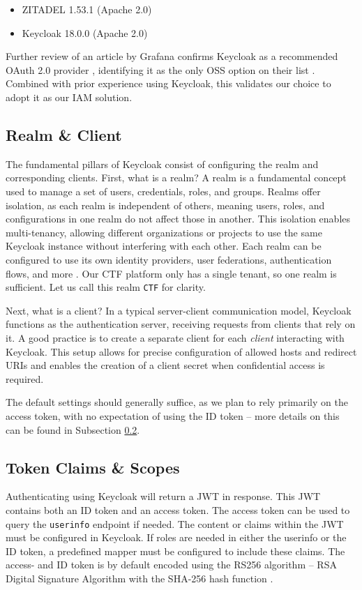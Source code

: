 \begin{itemize}
    \item ZITADEL 1.53.1 (Apache 2.0)
    \item Keycloak 18.0.0 (Apache 2.0)
\end{itemize}

Further review of an article by Grafana confirms Keycloak as a recommended OAuth 2.0 provider \parencite{keycloak}, identifying it as the only OSS option on their list \parencite{grafana_oauth}. Combined with prior experience using Keycloak, this validates our choice to adopt it as our IAM solution.

\subsection{Realm \& Client}
The fundamental pillars of Keycloak consist of configuring the realm and corresponding clients. First, what is a realm? A realm is a fundamental concept used to manage a set of users, credentials, roles, and groups. Realms offer isolation, as each realm is independent of others, meaning users, roles, and configurations in one realm do not affect those in another. This isolation enables multi-tenancy, allowing different organizations or projects to use the same Keycloak instance without interfering with each other. Each realm can be configured to use its own identity providers, user federations, authentication flows, and more \Parencite{keycloakDocs}. Our CTF platform only has a single tenant, so one realm is sufficient. Let us call this realm \texttt{CTF} for clarity.

Next, what is a client? In a typical server-client communication model, Keycloak functions as the authentication server, receiving requests from clients that rely on it. A good practice is to create a separate client for each \textit{client} interacting with Keycloak. This setup allows for precise configuration of allowed hosts and redirect URIs and enables the creation of a client secret when confidential access is required.

The default settings should generally suffice, as we plan to rely primarily on the access token, with no expectation of using the ID token -- more details on this can be found in Subsection \ref{sec:token_claims}.

\subsection{Token Claims \& Scopes}\label{sec:token_claims}
Authenticating using Keycloak will return a JWT in response. This JWT contains both an ID token and an access token. The access token can be used to query the \texttt{userinfo} endpoint if needed. The content or claims within the JWT must be configured in Keycloak. If roles are needed in either the userinfo or the ID token, a predefined mapper must be configured to include these claims. The access- and ID token is by default encoded using the RS256 algorithm -- RSA Digital Signature Algorithm with the SHA-256 hash function .

